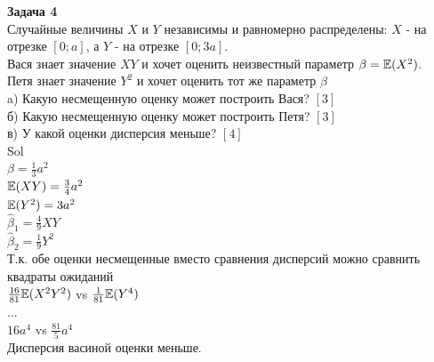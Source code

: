 \documentclass[12pt, a4paper]{article}\usepackage[]{graphicx}\usepackage[]{color}
\begin{document}
	\textbf{Задача 4} \\
	Случайные величины $X$ и $Y$ независимы и равномерно распределены: $X$ - на отрезке $[0;a]$, а $Y$ - на отрезке $[0;3a]$. \\
	Вася знает значение $XY$ и хочет оценить неизвестный параметр $\beta=\mathbb{E}(X^{2})$. \\
	Петя знает значение $Y^2$ и хочет оценить тот же параметр $\beta$ \\
	a) Какую несмещенную оценку может построить Вася? $[3]$ \\
	б) Какую несмещенную оценку может построить Петя? $[3]$ \\
	в) У какой оценки дисперсия меньше? $[4]$ \\
	Sol \\
	$\beta=\frac{1}{3}a^{2}$ \\
	$\mathbb{E}(XY)=\frac{3}{4}a^{2}$ \\
	$\mathbb{E}(Y^{2})=3a^{2}$\\
	$\hat{\beta}_{1}=\frac{4}{9}XY$ \\
	$\hat{\beta}_{2}=\frac{1}{9}Y^{2}$ \\
	Т.к. обе оценки несмещенные вместо сравнения дисперсий можно сравнить квадраты ожиданий \\
	$\frac{16}{81}\mathbb{E}(X^{2}Y^{2})$ vs $\frac{1}{81}\mathbb{E}(Y^{4})$ \\
	... \\
	$16 a^4$ vs $\frac{81}{5} a^{4}$ \\
	Дисперсия васиной оценки меньше. \\





\end{document}
